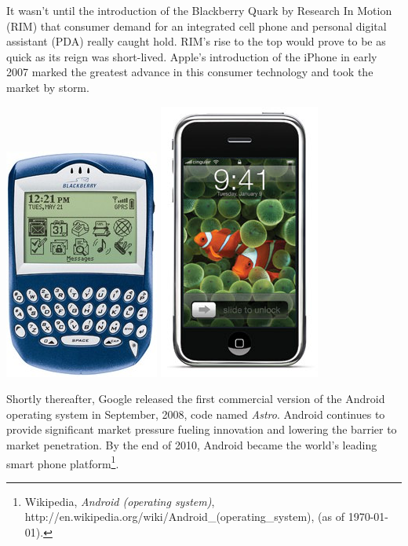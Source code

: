 \documentclass[letterpaper,12pt]{article}
\begin{document}
It wasn't until the introduction of the Blackberry Quark by Research In Motion (RIM) that consumer demand for an integrated cell phone and personal digital assistant (PDA) really caught hold.  RIM's rise to the top would prove to be as quick as its reign was short-lived.  Apple's introduction of the iPhone in early 2007 marked the greatest advance in this consumer technology and took the market by storm. 

\begin{center}
\includegraphics[scale=0.8]{images/blackberry_6200}
\includegraphics[scale=0.6]{images/apple-iphone}
\end{center}

Shortly thereafter, Google released the first commercial version of the Android operating system in September, 2008, code named \emph{Astro}.  Android continues to provide significant market pressure fueling innovation and lowering the barrier to market penetration.  By the end of 2010, Android became the world's leading smart phone platform\footnote{Wikipedia, \emph{Android (operating system)}, http://en.wikipedia.org/wiki/Android\_(operating\_system), (as of \today).}.
\end{document}
